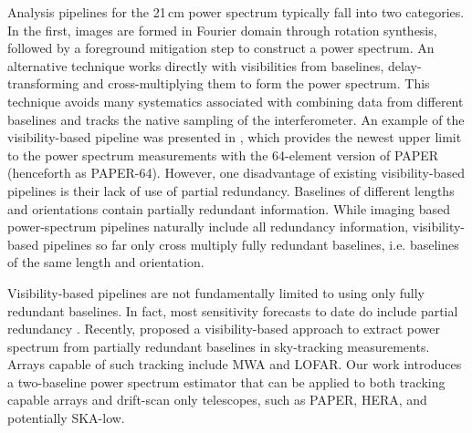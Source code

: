 \documentclass[twocolumn,apj,numberedappendix]{emulateapj}
\renewcommand\[{\begin{equation}}
\renewcommand\]{\end{equation}}
\begin{document}
Analysis pipelines for the 21\,cm power spectrum typically fall into two categories. In the first, images are formed in Fourier domain through rotation synthesis, followed by a foreground mitigation step to construct a power spectrum. An alternative technique works directly with visibilities from baselines, delay-transforming and cross-multiplying them to form the power spectrum. This technique avoids many systematics associated with combining data from different baselines and tracks the native sampling of the interferometer. An example of the visibility-based pipeline was presented in \cite{Ali2015}, which provides the newest upper limit to the power spectrum
measurements with the 64-element version of PAPER (henceforth as PAPER-64). However, one disadvantage of existing visibility-based pipelines is their lack of use of partial redundancy. Baselines of different lengths and orientations contain partially redundant information. While imaging based power-spectrum pipelines naturally include all redundancy information, visibility-based pipelines so far only cross multiply fully redundant baselines, i.e. baselines of the same length and orientation.

Visibility-based pipelines are not fundamentally limited to using only fully redundant baselines. In fact, most sensitivity forecasts to date do include partial redundancy \citep{Pobersens, HERA, JoshAntPos}. Recently, \cite{wterm} proposed a visibility-based approach to extract power spectrum from partially redundant baselines in sky-tracking measurements. Arrays capable of such tracking include MWA and LOFAR. Our work introduces a two-baseline power spectrum estimator that can be applied to both tracking capable arrays and drift-scan only telescopes, such as PAPER, HERA, and potentially SKA-low.
\end{document}
